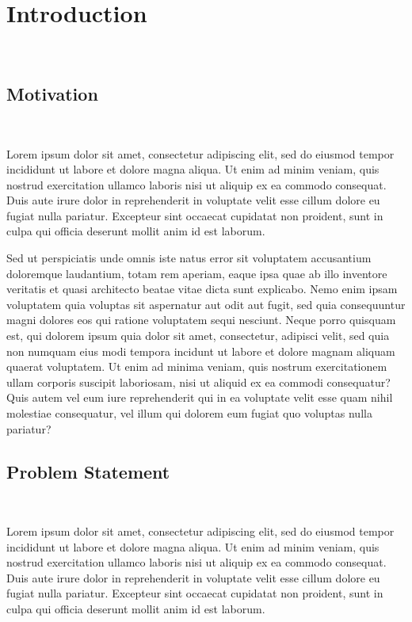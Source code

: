 
\section{Introduction}\


\subsection{Motivation}\
\label{ch:motivation}

Lorem ipsum dolor sit amet, consectetur adipiscing elit, sed do eiusmod tempor incididunt ut labore et dolore magna aliqua. Ut enim ad minim veniam, quis nostrud exercitation ullamco laboris nisi ut aliquip ex ea commodo consequat. Duis aute irure dolor in reprehenderit in voluptate velit esse cillum dolore eu fugiat nulla pariatur. Excepteur sint occaecat cupidatat non proident, sunt in culpa qui officia deserunt mollit anim id est laborum.

Sed ut perspiciatis unde omnis iste natus error sit voluptatem accusantium doloremque laudantium, totam rem aperiam, eaque ipsa quae ab illo inventore veritatis et quasi architecto beatae vitae dicta sunt explicabo. Nemo enim ipsam voluptatem quia voluptas sit aspernatur aut odit aut fugit, sed quia consequuntur magni dolores eos qui ratione voluptatem sequi nesciunt. Neque porro quisquam est, qui dolorem ipsum quia dolor sit amet, consectetur, adipisci velit, sed quia non numquam eius modi tempora incidunt ut labore et dolore magnam aliquam quaerat voluptatem. Ut enim ad minima veniam, quis nostrum exercitationem ullam corporis suscipit laboriosam, nisi ut aliquid ex ea commodi consequatur? Quis autem vel eum iure reprehenderit qui in ea voluptate velit esse quam nihil molestiae consequatur, vel illum qui dolorem eum fugiat quo voluptas nulla pariatur?


 
\subsection{Problem Statement}\

Lorem ipsum dolor sit amet, consectetur adipiscing elit, sed do eiusmod tempor incididunt ut labore et dolore magna aliqua. Ut enim ad minim veniam, quis nostrud exercitation ullamco laboris nisi ut aliquip ex ea commodo consequat. Duis aute irure dolor in reprehenderit in voluptate velit esse cillum dolore eu fugiat nulla pariatur. Excepteur sint occaecat cupidatat non proident, sunt in culpa qui officia deserunt mollit anim id est laborum.



